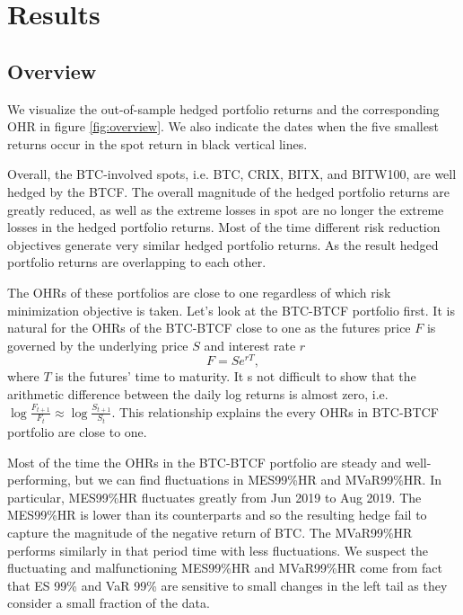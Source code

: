 \section{Results}\label{sec:results}

%


\subsection{Overview}\label{sec:overview}
We visualize the out-of-sample hedged portfolio returns and the corresponding OHR in figure \ref{fig:overview}.
We also indicate the dates when the five smallest returns occur in the spot return in black vertical lines. \medskip

Overall, the BTC-involved spots, i.e. BTC, CRIX, BITX, and BITW100,  are well hedged by the BTCF.
The overall magnitude of the hedged portfolio returns are greatly reduced, as well as the extreme losses in spot are no longer the extreme losses in the hedged portfolio returns.
Most of the time different risk reduction objectives generate very similar hedged portfolio returns.
As the result hedged portfolio returns are overlapping to each other. \medskip

The OHRs of these portfolios are close to one regardless of which risk minimization objective is taken.
Let's look at the BTC-BTCF portfolio first.
It is natural for the OHRs of the BTC-BTCF close to one as the futures price $F$ is governed by the underlying price $S$ and interest rate $r$
$$F = Se^{rT},$$
where $T$ is the futures' time to maturity.
It s not difficult to show that the arithmetic difference between the daily log returns is almost zero, i.e. $\log\frac{F_{t+1}}{F_t} \approx \log\frac{S_{t+1}}{S_t}$.
This relationship explains the every OHRs in BTC-BTCF portfolio are close to one. \medskip

Most of the time the OHRs in the BTC-BTCF portfolio are steady and well-performing,
but we can find fluctuations in MES99\%HR and MVaR99\%HR.
In particular, MES99\%HR fluctuates greatly from Jun 2019 to Aug 2019.
The MES99\%HR is lower than its counterparts and so the resulting hedge fail to capture the magnitude of the negative return of BTC.
The MVaR99\%HR performs similarly in that period time with less fluctuations.
We suspect the fluctuating and malfunctioning MES99\%HR and MVaR99\%HR come from fact that ES 99\% and VaR 99\% are sensitive to small changes in the left tail as they consider a small fraction
of the data. \medskip

